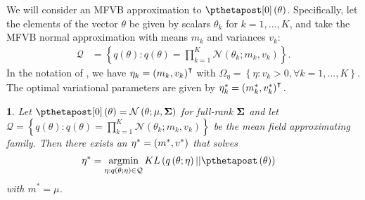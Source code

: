 \documentclass{article}\usepackage[]{graphicx}\usepackage[]{color}
\theoremstyle{definition}
\theoremstyle{plain}
\theoremstyle{plain}
\theoremstyle{plain}
\theoremstyle{definition}
\theoremstyle{plain}
\newtheorem{lem}{\protect\lemmaname}
\theoremstyle{plain}
\providecommand{\lemmaname}{Lemma}
\begin{document}
We will consider an MFVB approximation to $\pzeropost\left(\theta\right)$.
Specifically, let the elements of the vector $\theta$ be given by
scalars $\theta_{k}$ for $k=1,...,K$, and take the MFVB normal approximation
with means $m_{k}$ and variances $v_{k}$:
\begin{align*}
\mathcal{Q} & =\left\{ q\left(\theta\right):
    q\left(\theta\right)=\prod_{k=1}^{K}
    \mathcal{N}\left(\theta_{k};m_{k},v_{k}\right)\right\}.
\end{align*}
In the notation of , we have $\eta_{k}=\left(m_{k},v_{k}\right)^{\intercal}$
with $\Omega_{\eta}=\left\{ \eta:v_{k}>0,\forall k=1,...,K\right\} $.
The optimal variational parameters are given by $\eta_{k}^{*}=\left(m_{k}^{*},v_{k}^{*}\right)^{\intercal}.$
\begin{lem}
    \label{lem:mvn_exact}Let
$\pzeropost\left(\theta\right)=\mathcal{N}\left(\theta;\mu,\covmat\right)$ for
full-rank $\boldsymbol{\Sigma}$ and let $\mathcal{Q}=\left\{
q\left(\theta\right):q\left(\theta\right)=\prod_{k=1}^{K}\mathcal{N}\left(\theta_{k};m_{k},v_{k}\right)\right\} $
be the mean field approximating family. Then there exists an
$\eta^{*}=\left(m^{*},v^{*}\right)$ that solves
\begin{align*}
\etaopt & =\argmin_{\eta:q\left(\theta;\eta\right)\in\mathcal{Q}}KL\left(q\left(\theta;\eta\right)||\pthetapost\left(\theta\right)\right)
\end{align*}
with $m^{*}=\mu$.
\end{lem}
\end{document}
